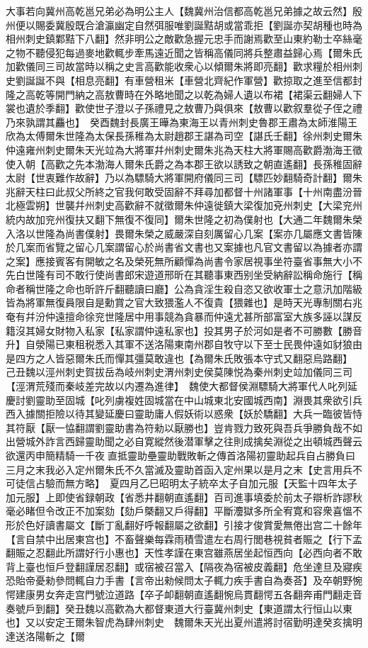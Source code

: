 大事若向冀州高乾邕兄弟必為明公主人【魏冀州治信都高乾邕兄弟據之故云然】殷州便以賜委冀殷既合滄瀛幽定自然弭服唯劉誕黠胡或當乖拒【劉誕亦契胡種也時為相州刺史鎮鄴黠下八翻】然非明公之敵歡急握元忠手而謝焉歡至山東約勒士卒絲毫之物不聽侵犯每過麥地歡輒步牽馬遠近聞之皆稱高儀同將兵整肅益歸心焉【爾朱氏加歡儀同三司故當時以稱之史言高歡能收衆心以傾爾朱將即亮翻】歡求糧於相州刺史劉誕誕不與【相息亮翻】有車營租米【車營北齊紀作軍營】歡掠取之進至信都封隆之高乾等開門納之高敖曹時在外略地聞之以乾為婦人遺以布裙【裙渠云翻婦人下裳也遺於季翻】歡使世子澄以子孫禮見之敖曹乃與俱來【敖曹以歡叙羣從子侄之禮乃來孰謂其麤也】　癸酉魏封長廣王曄為東海王以青州刺史魯郡王肅為太師淮陽王欣為太傅爾朱世隆為太保長孫稚為太尉趙郡王諶為司空【諶氏壬翻】徐州刺史爾朱仲遠雍州刺史爾朱天光竝為大將軍幷州刺史爾朱兆為天柱大將軍賜高歡爵渤海王徵使入朝【高歡之先本渤海人爾朱氏爵之為本郡王欲以誘致之朝直遙翻】長孫稚固辭太尉【世衷難作故辭】乃以為驃騎大將軍開府儀同三司【驃匹妙翻騎奇計翻】爾朱兆辭天柱曰此叔父所終之官我何敢受固辭不拜尋加都督十州諸軍事【十州南盡汾晉北極雲朔】世襲幷州刺史高歡辭不就徵爾朱仲遠徙鎮大梁復加兗州刺史【大梁兖州統内故加兖州復扶又翻下無復不復同】爾朱世隆之初為僕射也【大通二年魏爾朱榮入洛以世隆為尚書僕射】畏爾朱榮之威嚴深自刻厲留心几案【案亦几屬應文書皆陳於几案而省覽之留心几案謂留心於尚書省文書也又案據也凡官文書留以為據者亦謂之案】應接賓客有開敏之名及榮死無所顧憚為尚書令家居視事坐符臺省事無大小不先白世隆有司不敢行使尚書郎宋遊道邢昕在其聽事東西别坐受納辭訟稱命施行【稱命者稱世隆之命也昕許斤翻聽讀曰廳】公為貪淫生殺自恣又欲收軍士之意汛加階級皆為將軍無復員限自是勳賞之官大致猥濫人不復貴【猥雜也】是時天光專制關右兆奄有幷汾仲遠擅命徐兖世隆居中用事競為貪暴而仲遠尤甚所部富室大族多誣以謀反籍沒其婦女財物入私家【私家謂仲遠私家也】投其男子於河如是者不可勝數【勝音升】自滎陽已東租税悉入其軍不送洛陽東南州郡自牧守以下至士民畏仲遠如豺狼由是四方之人皆惡爾朱氏而憚其彊莫敢違也【為爾朱氏敗張本守式又翻惡烏路翻】　己丑魏以涇州刺史賀拔岳為岐州刺史渭州刺史侯莫陳悦為秦州刺史竝加儀同三司【涇渭荒殘而秦岐差完故以内遷為進律】　魏使大都督侯淵驃騎大將軍代人叱列延慶討劉靈助至固城【叱列虜複姓固城當在中山城東北安國城西南】淵畏其衆欲引兵西入據關拒險以待其變延慶曰靈助庸人假妖術以惑衆【妖於驕翻】大兵一臨彼皆恃其符厭【厭一恊翻謂劉靈助書為符勑以厭勝也】豈肯戮力致死與吾兵爭勝負哉不如出營城外詐言西歸靈助聞之必自寛縱然後潜軍擊之往則成擒矣淵從之出頓城西聲云欲還丙申簡精騎一千夜直抵靈助壘靈助戰敗斬之傳首洛陽初靈助起兵自占勝負曰三月之末我必入定州爾朱氏不久當滅及靈助首函入定州果以是月之末【史言用兵不可徒信占驗而無方略】　夏四月乙巳昭明太子統卒太子自加元服【天監十四年太子加元服】上即使省録朝政【省悉井翻朝直遙翻】百司進事填委於前太子辯析詐謬秋毫必睹但令改正不加案劾【劾戶槩翻又戶得翻】平斷灋獄多所全宥寛和容衆喜慍不形於色好讀書屬文【斷丁亂翻好呼報翻屬之欲翻】引接才俊賞愛無倦出宫二十餘年【言自禁中出居東宫也】不畜聲樂每霖雨積雪遣左右周行閭巷視貧者賑之【行下孟翻賑之忍翻此所謂好行小惠也】天性孝謹在東宫雖燕居坐起恒西向【必西向者不敢背上臺也恒戶登翻謹居忍翻】或宿被召當入【隔夜為宿被皮義翻】危坐達旦及寢疾恐貽帝憂勑參問輒自力手書【言帝出勑候問太子輒力疾手書自為奏荅】及卒朝野惋愕建康男女奔走宫門號泣道路【卒子卹翻朝直遙翻惋烏貫翻愕五各翻奔甫門翻走音奏號戶到翻】癸丑魏以高歡為大都督東道大行臺冀州刺史【東道謂太行恒山以東也】又以安定王爾朱智虎為肆州刺史　魏爾朱天光出夏州遣將討宿勤明達癸亥擒明達送洛陽斬之【爾